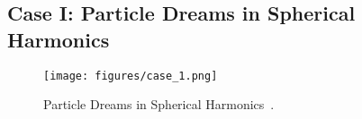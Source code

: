 \subsection{Case I: Particle Dreams in Spherical Harmonics}
\label{ssection:particle}


\begin{figure}[h]
 \centering
 \texttt{[image: figures/case\_1.png]}
 \vspace{-2em}
 \caption{Particle Dreams in Spherical Harmonics~\cite{sandin}.}
 \label{fig:cases_1}
 \vspace{-0.5em}
\end{figure}

